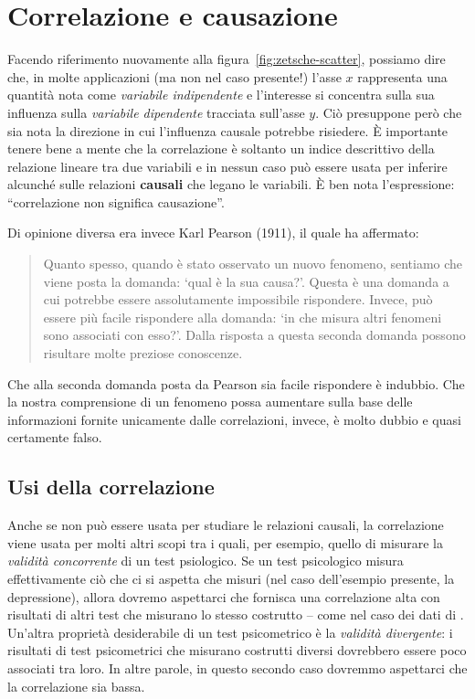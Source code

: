 \documentclass[
  11pt,
  italian,
  a4paper,
  extrafontsizes,onecolumn,openright
  ]{memoir}
\theoremstyle{definition}
\theoremstyle{definition}
\theoremstyle{definition}
\theoremstyle{definition}
\theoremstyle{remark}
\begin{document}
\hypertarget{correlazione-e-causazione}{%
\section{Correlazione e causazione}\label{correlazione-e-causazione}}

Facendo riferimento nuovamente alla figura~\ref{fig:zetsche-scatter}, possiamo dire che, in molte applicazioni (ma non nel caso presente!) l'asse \(x\) rappresenta una quantità nota come \emph{variabile indipendente} e l'interesse si concentra sulla sua influenza sulla \emph{variabile dipendente} tracciata sull'asse \(y\). Ciò presuppone però che sia nota la direzione in cui l'influenza causale potrebbe risiedere. È importante tenere bene a mente che la correlazione è soltanto un indice descrittivo della relazione lineare tra due variabili e in nessun caso può essere usata per inferire alcunché sulle relazioni \textbf{causali} che legano le variabili. È ben nota l'espressione: ``correlazione non significa causazione''.

Di opinione diversa era invece Karl Pearson (1911), il quale ha affermato:

\begin{quote}
Quanto spesso, quando è stato osservato un nuovo fenomeno,
sentiamo che viene posta la domanda: `qual è la sua causa?'. Questa è
una domanda a cui potrebbe essere assolutamente impossibile rispondere.
Invece, può essere più facile rispondere alla domanda: `in che misura
altri fenomeni sono associati con esso?'. Dalla risposta a questa
seconda domanda possono risultare molte preziose conoscenze.
\end{quote}

Che alla seconda domanda posta da Pearson sia facile rispondere è indubbio. Che la nostra comprensione di un fenomeno possa aumentare sulla base delle
informazioni fornite unicamente dalle correlazioni, invece, è molto dubbio e quasi certamente falso.

\hypertarget{usi-della-correlazione}{%
\subsection{Usi della correlazione}\label{usi-della-correlazione}}

Anche se non può essere usata per studiare le relazioni causali, la
correlazione viene usata per molti altri scopi tra i quali, per esempio,
quello di misurare la \emph{validità concorrente} di un test psiologico. Se
un test psicologico misura effettivamente ciò che ci si aspetta che
misuri (nel caso dell'esempio presente, la depressione), allora dovremo
aspettarci che fornisca una correlazione alta con risultati di altri
test che misurano lo stesso costrutto -- come nel caso dei dati di
\autocite{zetschefuture2019}. Un'altra proprietà desiderabile di un test
psicometrico è la \emph{validità divergente}: i risultati di test
psicometrici che misurano costrutti diversi dovrebbero essere poco
associati tra loro. In altre parole, in questo secondo caso dovremmo
aspettarci che la correlazione sia bassa.
\end{document}
